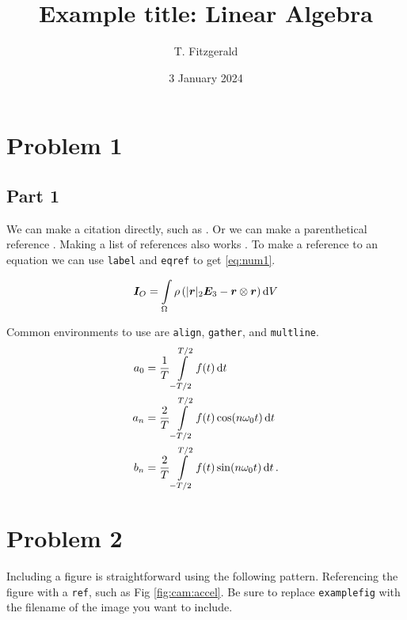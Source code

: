 \documentclass{homework}
\title{Example title: Linear Algebra}
\author{T. Fitzgerald}
\date{3 January 2024}
\begin{document}
\maketitle
\tableofcontents

\section{Problem 1}

\subsection{Part 1}
We can make a citation directly, such as \citet{Udwadia2007}.
Or we can make a parenthetical reference \citep{Ackermann1972}.
Making a list of references also works \citep{Willard2018,Akhtaruzzaman2010,Trefethen2015}.
To make a reference to an equation we can use \texttt{label} and \texttt{eqref} to get \eqref{eq:num1}.

\begin{align}\label{eq:num1}
    \bm{I}_O = \int\limits_\Omega \rho \left( |\bm{r}|_2 \bm{E}_3 - \bm{r} \otimes \bm{r}  \right) \mathop{}\!\mathrm{d} V
\end{align}

Common environments to use are \texttt{align}, \texttt{gather}, and \texttt{multline}.
\begin{align}
    a_0 &= \frac{1}{T}\int\limits_{-T/2}^{T/2} f(t)\mathop{}\!\mathrm{d} t
    \\
    a_n &= \frac{2}{T} \int\limits_{-T/2}^{T/2} f(t) \cos(n \omega_0 t)\mathop{}\!\mathrm{d} t
    \\
    b_n &= \frac{2}{T} \int\limits_{-T/2}^{T/2} f(t) \sin(n \omega_0 t)\mathop{}\!\mathrm{d} t \, .
\end{align}
  

\newpage
\section{Problem 2}

Including a figure is straightforward using the following pattern.
Referencing the figure with a \texttt{ref}, such as Fig \ref{fig:cam:accel}.
Be sure to replace \texttt{examplefig} with the filename of the image you want to include.
\end{document}
